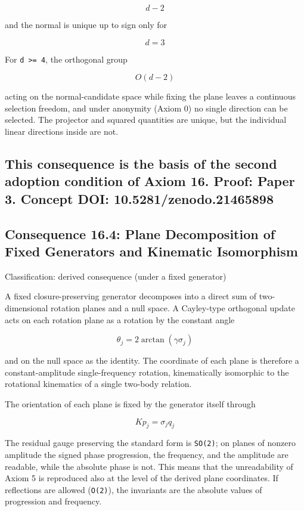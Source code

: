 \documentclass[
  a4paper,
]{article}
\begin{document}
\[
d-2
\]

and the normal is unique up to sign only for

\[
d=3
\]

For \texttt{d\ \textgreater{}=\ 4}, the orthogonal group

\[
O(d-2)
\]

acting on the normal-candidate space while fixing the plane leaves a
continuous selection freedom, and under anonymity (Axiom 0) no single
direction can be selected. The projector and squared quantities are
unique, but the individual linear directions inside are not.

\subsection{This consequence is the basis of the second adoption
condition of Axiom 16. Proof: Paper 3. Concept DOI:
10.5281/zenodo.21465898}\label{this-consequence-is-the-basis-of-the-second-adoption-condition-of-axiom-16.-proof-paper-3.-concept-doi-10.5281zenodo.21465898}

\subsection{Consequence 16.4: Plane Decomposition of Fixed Generators
and Kinematic
Isomorphism}\label{consequence-16.4-plane-decomposition-of-fixed-generators-and-kinematic-isomorphism}

Classification: derived consequence (under a fixed generator)

A fixed closure-preserving generator decomposes into a direct sum of
two-dimensional rotation planes and a null space. A Cayley-type
orthogonal update acts on each rotation plane as a rotation by the
constant angle

\[
\theta_j=2\arctan(\gamma\sigma_j)
\]

and on the null space as the identity. The coordinate of each plane is
therefore a constant-amplitude single-frequency rotation, kinematically
isomorphic to the rotational kinematics of a single two-body relation.

The orientation of each plane is fixed by the generator itself through

\[
Kp_j=\sigma_j q_j
\]

The residual gauge preserving the standard form is \texttt{SO(2)}; on
planes of nonzero amplitude the signed phase progression, the frequency,
and the amplitude are readable, while the absolute phase is not. This
means that the unreadability of Axiom 5 is reproduced also at the level
of the derived plane coordinates. If reflections are allowed
(\texttt{O(2)}), the invariants are the absolute values of progression
and frequency.
\end{document}

